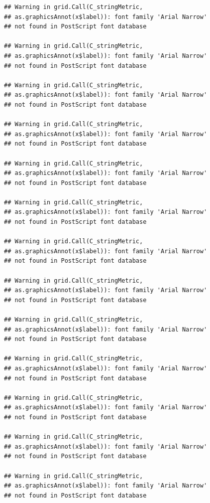 \documentclass[]{krantz}
\begin{document}
\begin{verbatim}
## Warning in grid.Call(C_stringMetric,
## as.graphicsAnnot(x$label)): font family 'Arial Narrow'
## not found in PostScript font database

## Warning in grid.Call(C_stringMetric,
## as.graphicsAnnot(x$label)): font family 'Arial Narrow'
## not found in PostScript font database

## Warning in grid.Call(C_stringMetric,
## as.graphicsAnnot(x$label)): font family 'Arial Narrow'
## not found in PostScript font database

## Warning in grid.Call(C_stringMetric,
## as.graphicsAnnot(x$label)): font family 'Arial Narrow'
## not found in PostScript font database

## Warning in grid.Call(C_stringMetric,
## as.graphicsAnnot(x$label)): font family 'Arial Narrow'
## not found in PostScript font database

## Warning in grid.Call(C_stringMetric,
## as.graphicsAnnot(x$label)): font family 'Arial Narrow'
## not found in PostScript font database

## Warning in grid.Call(C_stringMetric,
## as.graphicsAnnot(x$label)): font family 'Arial Narrow'
## not found in PostScript font database

## Warning in grid.Call(C_stringMetric,
## as.graphicsAnnot(x$label)): font family 'Arial Narrow'
## not found in PostScript font database

## Warning in grid.Call(C_stringMetric,
## as.graphicsAnnot(x$label)): font family 'Arial Narrow'
## not found in PostScript font database

## Warning in grid.Call(C_stringMetric,
## as.graphicsAnnot(x$label)): font family 'Arial Narrow'
## not found in PostScript font database

## Warning in grid.Call(C_stringMetric,
## as.graphicsAnnot(x$label)): font family 'Arial Narrow'
## not found in PostScript font database

## Warning in grid.Call(C_stringMetric,
## as.graphicsAnnot(x$label)): font family 'Arial Narrow'
## not found in PostScript font database

## Warning in grid.Call(C_stringMetric,
## as.graphicsAnnot(x$label)): font family 'Arial Narrow'
## not found in PostScript font database
\end{verbatim}
\end{document}
